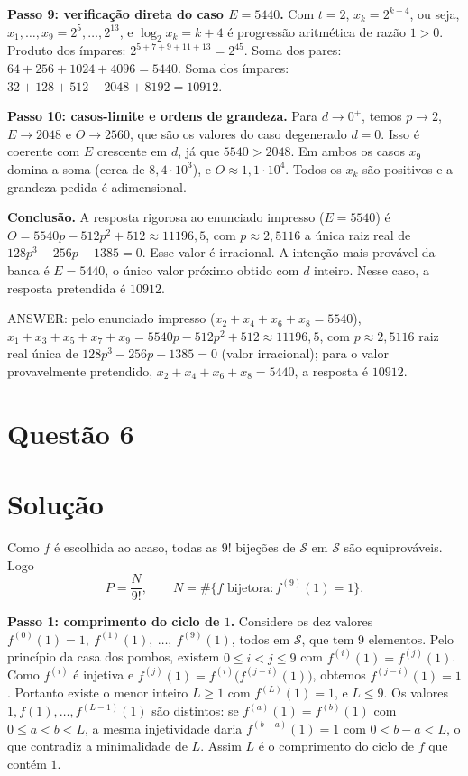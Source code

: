 \documentclass{article}%
\begin{document}
\textbf{Passo 9: verificação direta do caso $E=5440$.} Com $t=2$, $x_k=2^{k+4}$, ou seja, $x_1,\dots,x_9=2^5,\dots,2^{13}$, e $\log_2 x_k=k+4$ é progressão aritmética de razão $1>0$. Produto dos ímpares: $2^{5+7+9+11+13}=2^{45}$. Soma dos pares: $64+256+1024+4096=5440$. Soma dos ímpares: $32+128+512+2048+8192=10912$.

\textbf{Passo 10: casos-limite e ordens de grandeza.} Para $d\to0^+$, temos $p\to2$, $E\to2048$ e $O\to2560$, que são os valores do caso degenerado $d=0$. Isso é coerente com $E$ crescente em $d$, já que $5540>2048$. Em ambos os casos $x_9$ domina a soma (cerca de $8{,}4\cdot10^3$), e $O\approx 1{,}1\cdot10^4$. Todos os $x_k$ são positivos e a grandeza pedida é adimensional.

\textbf{Conclusão.} A resposta rigorosa ao enunciado impresso ($E=5540$) é $O=5540p-512p^2+512\approx 11196{,}5$, com $p\approx 2{,}5116$ a única raiz real de $128p^3-256p-1385=0$. Esse valor é irracional. A intenção mais provável da banca é $E=5440$, o único valor próximo obtido com $d$ inteiro. Nesse caso, a resposta pretendida é $10912$.

ANSWER: pelo enunciado impresso ($x_2+x_4+x_6+x_8=5540$), $x_1+x_3+x_5+x_7+x_9=5540p-512p^2+512\approx 11196{,}5$, com $p\approx 2{,}5116$ raiz real única de $128p^3-256p-1385=0$ (valor irracional); para o valor provavelmente pretendido, $x_2+x_4+x_6+x_8=5440$, a resposta é $10912$.%
\newpage%
\section*{Questão 6}

\section*{Solução}

Como $f$ é escolhida ao acaso, todas as $9!$ bijeções de $\mathcal{S}$ em $\mathcal{S}$ são equiprováveis. Logo
\[
P=\frac{N}{9!}, \qquad N=\#\{f \text{ bijetora} : f^{(9)}(1)=1\}.
\]

\textbf{Passo 1: comprimento do ciclo de $1$.} Considere os dez valores $f^{(0)}(1)=1,\ f^{(1)}(1),\ \dots,\ f^{(9)}(1)$, todos em $\mathcal{S}$, que tem 9 elementos. Pelo princípio da casa dos pombos, existem $0\le i<j\le 9$ com $f^{(i)}(1)=f^{(j)}(1)$. Como $f^{(i)}$ é injetiva e $f^{(j)}(1)=f^{(i)}\big(f^{(j-i)}(1)\big)$, obtemos $f^{(j-i)}(1)=1$. Portanto existe o menor inteiro $L\ge 1$ com $f^{(L)}(1)=1$, e $L\le 9$. Os valores $1,f(1),\dots,f^{(L-1)}(1)$ são distintos: se $f^{(a)}(1)=f^{(b)}(1)$ com $0\le a<b<L$, a mesma injetividade daria $f^{(b-a)}(1)=1$ com $0<b-a<L$, o que contradiz a minimalidade de $L$. Assim $L$ é o comprimento do ciclo de $f$ que contém $1$.
\end{document}
